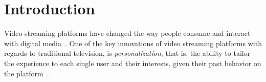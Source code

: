
\chapter{Introduction}
\label{chapter:introduction}


Video streaming platforms have changed the way people consume and interact with digital media~\cite{NetflixReco}. 
One of the key innovations of video streaming platforms with regards to traditional television, is \emph{personalization}, that is, the ability to tailor the experience to each single user and their interests, given their past behavior on the platform~\cite{oldPersonalizationBehavior, oldPersonalizationSearch}. 

